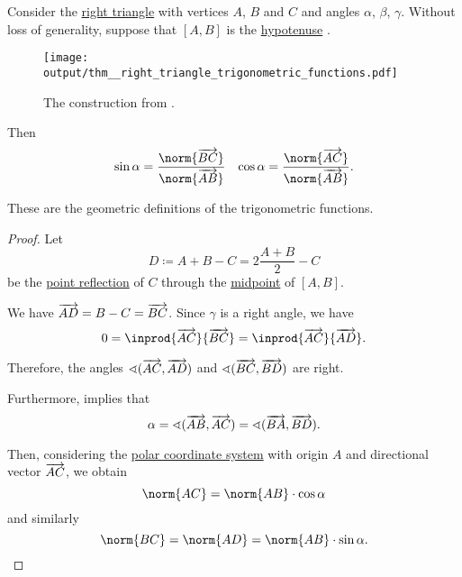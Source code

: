 \begin{proposition}\label{thm:right_triangle_trigonometric_functions}
  Consider the \hyperref[def:triangle/right]{right triangle} with vertices \( A \), \( B \) and \( C \) and angles \( \alpha \), \( \beta \), \( \gamma \). Without loss of generality, suppose that \( [A, B] \) is the \hyperref[thm:right_triangle]{hypotenuse} .

  \begin{figure}[!ht]
    \centering
    \texttt{[image: output/thm\_\_right\_triangle\_trigonometric\_functions.pdf]}
    \caption{The construction from .}\label{fig:thm:right_triangle_trigonometric_functions}
  \end{figure}

  Then
  \begin{align*}
    \sin \alpha = \frac {\norm{\vect{BC}}} {\norm{\vect{AB}}}
    &&
    \cos \alpha = \frac {\norm{\vect{AC}}} {\norm{\vect{AB}}}.
  \end{align*}

  These are the geometric definitions of the trigonometric functions.
\end{proposition}
\begin{proof}
  Let
  \begin{equation*}
    D \coloneqq A + B - C = 2 \frac {A + B} 2 - C
  \end{equation*}
  be the \hyperref[def:rigid_motion/point_reflection]{point reflection} of \( C \) through the \hyperref[thm:segment_midpoint]{midpoint} of \( [A, B] \).

  We have \( \overrightarrow{AD} = B - C = \overrightarrow{BC} \). Since \( \gamma \) is a right angle, we have
  \begin{equation*}
    0
    =
    \inprod{\vect{AC}} {\vect{BC}}
    =
    \inprod{\vect{AC}} {\vect{AD}}.
  \end{equation*}

  Therefore, the angles \( \sphericalangle(\overrightarrow{AC},\overrightarrow{AD}) \) and \( \sphericalangle(\overrightarrow{BC},\overrightarrow{BD}) \) are right.

  Furthermore,  implies that
  \begin{equation*}
    \alpha = \sphericalangle(\overrightarrow{AB},\overrightarrow{AC}) = \sphericalangle(\overrightarrow{BA},\overrightarrow{BD}).
  \end{equation*}

  Then, considering the \hyperref[rem:polar_coordinate_system]{polar coordinate system} with origin \( A \) and directional vector \( \overrightarrow{AC} \), we obtain
  \begin{equation*}
    \norm{AC} = \norm{AB} \cdot \cos \alpha
  \end{equation*}
  and similarly
  \begin{equation*}
    \norm{BC} = \norm{AD} = \norm{AB} \cdot \sin \alpha.
  \end{equation*}
\end{proof}

